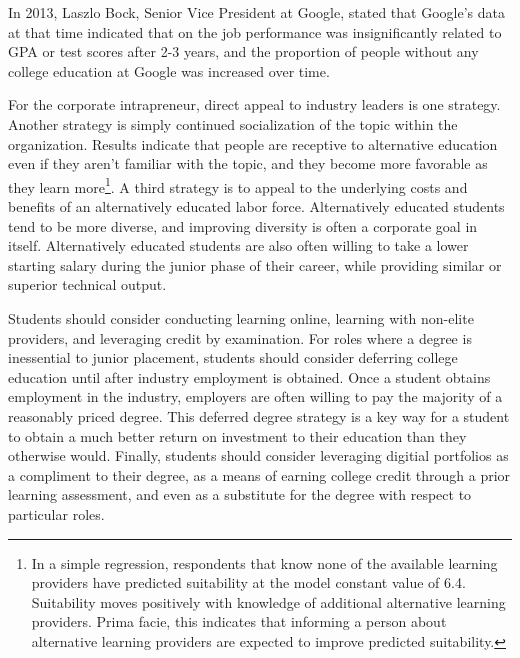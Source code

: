\documentclass[AER]{./aea-latex-templates/AEA}
\begin{document}
        In 2013, Laszlo Bock, Senior Vice President at Google, stated that Google’s data at that time indicated
        that on the job performance was insignificantly related to GPA or test
        scores after 2-3 years, and the proportion of people without any college
        education at Google was increased over time\cite{bryant_2013}.
        
        For the corporate intrapreneur, direct appeal to industry leaders is one strategy.
        Another strategy is simply continued socialization of the topic within the organization.
        Results indicate that people are receptive to alternative education even if they aren’t
        familiar with the topic, and they become more favorable as they learn
        more\footnote{In a simple regression, respondents that know none of the available learning providers have predicted suitability at the model constant value of 6.4.
        Suitability moves positively with knowledge of additional alternative learning providers.
        Prima facie, this indicates that informing a person about alternative learning providers are expected to improve predicted suitability.}.
        A third strategy is to appeal to the underlying costs and benefits of an alternatively educated labor force.
        Alternatively educated students tend to be more diverse\cite{florentine_2018}, and improving diversity is often a corporate goal in itself.
        Alternatively educated students are also often willing to take a lower starting salary during the junior phase of their career, while providing similar or superior technical output.
        
        Students should consider conducting learning online, learning with non-elite providers,
        and leveraging credit by examination.
        For roles where a degree is inessential to junior placement, students should consider
        deferring college education until after industry employment is obtained.
        Once a student obtains employment in the industry, employers are often willing to pay the majority of a reasonably priced degree.
        This deferred degree strategy is a key way for a student to obtain a much better return on investment to their education than they otherwise would.
        Finally, students should consider leveraging digitial portfolios as a compliment to their degree,
        as a means of earning college credit through a prior learning assessment,
        and even as a substitute for the degree with respect to particular roles.
        
\end{document}
